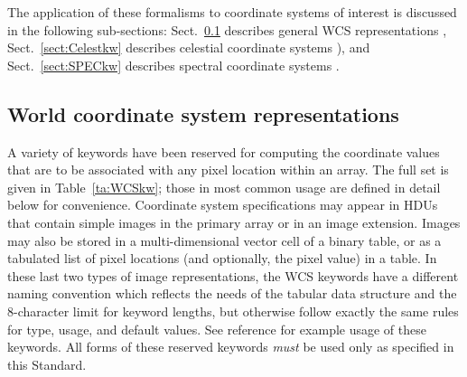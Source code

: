 \documentclass[onecolumn]{aa}
\begin{document}
The application of these formalisms to coordinate systems of interest is discussed
in the following sub-sections: Sect.\ \ref{sect:WCSkw} describes general WCS
representations \citep[see][]{greisen02}, Sect.\ \ref{sect:Celestkw} describes celestial coordinate
systems \citep[see][]{calabretta02}), and Sect.\ \ref{sect:SPECkw} describes spectral coordinate systems
\citep[see][]{greisen06}. 

\subsection{World coordinate system representations}\label{sect:WCSkw}

A variety of keywords have been reserved for computing the coordinate values that
are to be associated with any pixel location within an array. The full set is
given in Table~\ref{ta:WCSkw}; those in most common usage are defined in detail below for
convenience. Coordinate system specifications may appear in HDUs that contain
simple images in the primary array or in an image extension.  Images may also be 
stored in a  multi-dimensional vector cell of a binary table, or as a tabulated list of
pixel locations (and optionally, the pixel value) in a table.  In these last two types
of image representations, the WCS keywords have a different naming convention 
which reflects the needs of the tabular data structure
and the 8-character limit for keyword lengths, but otherwise follow exactly the
same rules for type, usage, and default values. See reference \cite{calabretta02}
for example usage of these keywords.
All forms of these reserved keywords
{\em must} be used only as specified in this Standard. 
\end{document}
